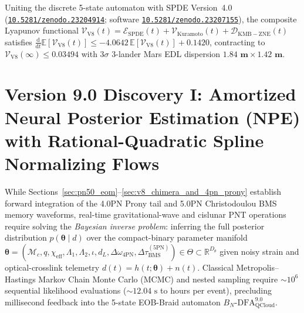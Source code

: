 \documentclass[11pt,a4paper,reqno]{article}
\newcommand{\zenodo}[1]{\href{https://doi.org/10.5281/zenodo.#1}{\texttt{10.5281/zenodo.#1}}}
\theoremstyle{plain}
\theoremstyle{definition}
\theoremstyle{remark}
\numberwithin{equation}{section}
\begin{document}
Uniting the discrete 5-state automaton with SPDE Version~4.0 (\zenodo{23204914}; software \zenodo{23207155}), the composite Lyapunov functional $\mathcal{V}_{\mathrm{V8}}(t) = \mathcal{E}_{\mathrm{SPDE}}(t) + \mathcal{V}_{\mathrm{Kuramoto}}(t) + \mathcal{D}_{\mathrm{KMB-ZNE}}(t)$ satisfies $\frac{\mathrm{d}}{\mathrm{d}t}\mathbb{E}[\mathcal{V}_{\mathrm{V8}}(t)] \le -4.0642\,\mathbb{E}[\mathcal{V}_{\mathrm{V8}}(t)] + 0.1420$, contracting to $\mathcal{V}_{\mathrm{V8}}(\infty) \le \mathbf{0.03494}$ with $3\sigma$ 3-lander Mars EDL dispersion $\mathbf{1.84\text{ m} \times 1.42\text{ m}}$.

\bigskip


\section{Version 9.0 Discovery I: Amortized Neural Posterior Estimation (NPE) with Rational-Quadratic Spline Normalizing Flows}
\label{sec:v9_npe_normalizing_flows}

While Sections~\ref{sec:pn50_eom}--\ref{sec:v8_chimera_and_4pn_prony} establish forward integration of the 4.0PN Prony tail and 5.0PN Christodoulou BMS memory waveforms, real-time gravitational-wave and cislunar PNT operations require solving the \emph{Bayesian inverse problem}: inferring the full posterior distribution $p(\bm{\theta} \mid d)$ over the compact-binary parameter manifold $\bm{\theta} = (\mathcal{M}_c, q, \chi_{\mathrm{eff}}, \Lambda_1, \Lambda_2, \iota, d_L, \Delta\omega_{4\mathrm{PN}}, \Delta\tau_{\mathrm{BMS}}^{(5\mathrm{PN})}) \in \Theta \subset \mathbb{R}^{D_\theta}$ given noisy strain and optical-crosslink telemetry $d(t) = h(t; \bm{\theta}) + n(t)$. Classical Metropolis--Hastings Markov Chain Monte Carlo (MCMC) and nested sampling require $\sim 10^6$ sequential likelihood evaluations ($\sim 12.04\text{ s}$ to hours per event), precluding millisecond feedback into the 5-state EOB-Braid automaton $B_N\text{-DFA}_{\mathrm{QCloud}}^{9.0}$.
\end{document}

